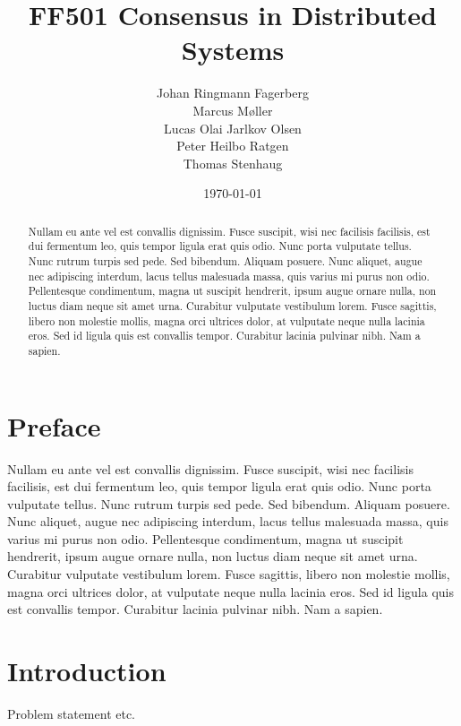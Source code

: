 \documentclass[a4paper,12pt]{article}
\date{\today}
\title{FF501 Consensus in Distributed Systems}
\author{
  Johan Ringmann Fagerberg \\
  Marcus Møller \\
  Lucas Olai Jarlkov Olsen \\
  Peter Heilbo Ratgen \\
  Thomas Stenhaug
}
\begin{document}
\maketitle

\begin{abstract}
  
  Nullam eu ante vel est convallis dignissim.  Fusce suscipit, wisi
  nec facilisis facilisis, est dui fermentum leo, quis tempor ligula
  erat quis odio.  Nunc porta vulputate tellus.  Nunc rutrum turpis
  sed pede.  Sed bibendum.  Aliquam posuere.  Nunc aliquet, augue nec
  adipiscing interdum, lacus tellus malesuada massa, quis varius mi
  purus non odio.  Pellentesque condimentum, magna ut suscipit
  hendrerit, ipsum augue ornare nulla, non luctus diam neque sit amet
  urna.  Curabitur vulputate vestibulum lorem.  Fusce sagittis, libero
  non molestie mollis, magna orci ultrices dolor, at vulputate neque
  nulla lacinia eros.  Sed id ligula quis est convallis tempor.
  Curabitur lacinia pulvinar nibh.  Nam a sapien.
  
\end{abstract}

\clearpage
\tableofcontents
\clearpage

\setcounter{page}{1}

\section{Preface}

Nullam eu ante vel est convallis dignissim.  Fusce suscipit, wisi nec
facilisis facilisis, est dui fermentum leo, quis tempor ligula erat
quis odio.  Nunc porta vulputate tellus.  Nunc rutrum turpis sed pede.
Sed bibendum.  Aliquam posuere.  Nunc aliquet, augue nec adipiscing
interdum, lacus tellus malesuada massa, quis varius mi purus non odio.
Pellentesque condimentum, magna ut suscipit hendrerit, ipsum augue
ornare nulla, non luctus diam neque sit amet urna.  Curabitur
vulputate vestibulum lorem.  Fusce sagittis, libero non molestie
mollis, magna orci ultrices dolor, at vulputate neque nulla lacinia
eros.  Sed id ligula quis est convallis tempor.  Curabitur lacinia
pulvinar nibh.  Nam a sapien.

\section{Introduction}

Problem statement etc.
\end{document}
